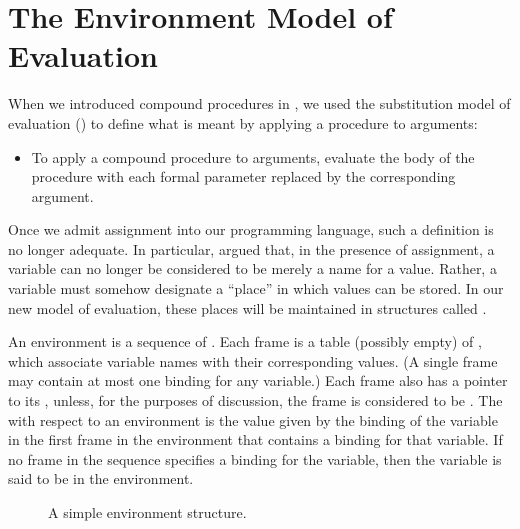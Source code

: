 \section{The Environment Model of Evaluation}
\label{Section 3.2}

When we introduced compound procedures in , we used the substitution model of evaluation () to define what is meant by applying a procedure to arguments:
\begin{itemize}

	\item
		To apply a compound procedure to arguments, evaluate the body of the procedure with each formal parameter replaced by the corresponding argument.

\end{itemize}

Once we admit assignment into our programming language, such a definition is no longer adequate.
In particular,  argued that, in the presence of assignment, a variable can no longer be considered to be merely a name for a value.
Rather, a variable must somehow designate a “place” in which values can be stored.
In our new model of evaluation, these places will be maintained in structures called .

An environment is a sequence of .
Each frame is a table (possibly empty) of , which associate variable names with their corresponding values.
(A single frame may contain at most one binding for any variable.)
Each frame also has a pointer to its , unless, for the purposes of discussion, the frame is considered to be .
The  with respect to an environment is the value given by the binding of the variable in the first frame in the environment that contains a binding for that variable.
If no frame in the sequence specifies a binding for the variable, then the variable is said to be  in the environment.

\begin{figure}[tb]
	\centering
	
	\caption{A simple environment structure.}
	\label{Figure 3.1}
\end{figure}

